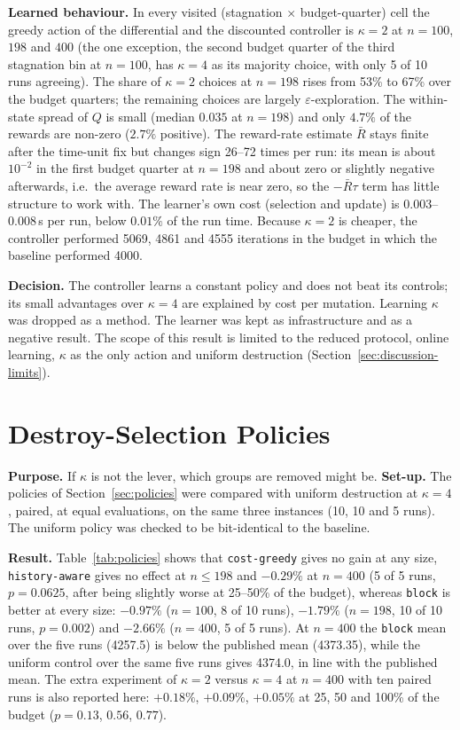 \textbf{Learned behaviour.} In every visited (stagnation $\times$ budget-quarter) cell the greedy action of the differential and the discounted controller is $\kappa=2$ at $n=100$, $198$ and $400$ (the one exception, the second budget quarter of the third stagnation bin at $n=100$, has $\kappa=4$ as its majority choice, with only 5 of 10 runs agreeing). The share of $\kappa=2$ choices at $n=198$ rises from 53\% to 67\% over the budget quarters; the remaining choices are largely $\varepsilon$-exploration. The within-state spread of $Q$ is small (median $0.035$ at $n=198$) and only $4.7\%$ of the rewards are non-zero ($2.7\%$ positive). The reward-rate estimate $\bar R$ stays finite after the time-unit fix but changes sign 26--72 times per run: its mean is about $10^{-2}$ in the first budget quarter at $n=198$ and about zero or slightly negative afterwards, i.e.\ the average reward rate is near zero, so the $-\bar R\tau$ term has little structure to work with. The learner's own cost (selection and update) is $0.003$--$0.008$\,s per run, below $0.01\%$ of the run time. Because $\kappa=2$ is cheaper, the controller performed 5069, 4861 and 4555 iterations in the budget in which the baseline performed 4000.

\textbf{Decision.} The controller learns a constant policy and does not beat its controls; its small advantages over $\kappa=4$ are explained by cost per mutation. Learning $\kappa$ was dropped as a method. The learner was kept as infrastructure and as a negative result. The scope of this result is limited to the reduced protocol, online learning, $\kappa$ as the only action and uniform destruction (Section~\ref{sec:discussion-limits}).


\section{Destroy-Selection Policies}\label{sec:exp-policies}

\textbf{Purpose.} If $\kappa$ is not the lever, which groups are removed might be. \textbf{Set-up.} The policies of Section~\ref{sec:policies} were compared with uniform destruction at $\kappa=4$, paired, at equal evaluations, on the same three instances (10, 10 and 5 runs). The uniform policy was checked to be bit-identical to the baseline.

\textbf{Result.} Table~\ref{tab:policies} shows that \texttt{cost-greedy} gives no gain at any size, \texttt{history-aware} gives no effect at $n\le198$ and $-0.29\%$ at $n=400$ (5 of 5 runs, $p=0.0625$, after being slightly worse at 25--50\% of the budget), whereas \texttt{block} is better at every size: $-0.97\%$ ($n=100$, 8 of 10 runs), $-1.79\%$ ($n=198$, 10 of 10 runs, $p=0.002$) and $-2.66\%$ ($n=400$, 5 of 5 runs). At $n=400$ the \texttt{block} mean over the five runs (4257.5) is below the published mean (4373.35), while the uniform control over the same five runs gives 4374.0, in line with the published mean. The extra experiment of $\kappa=2$ versus $\kappa=4$ at $n=400$ with ten paired runs is also reported here: $+0.18\%$, $+0.09\%$, $+0.05\%$ at 25, 50 and 100\% of the budget ($p=0.13$, $0.56$, $0.77$).

